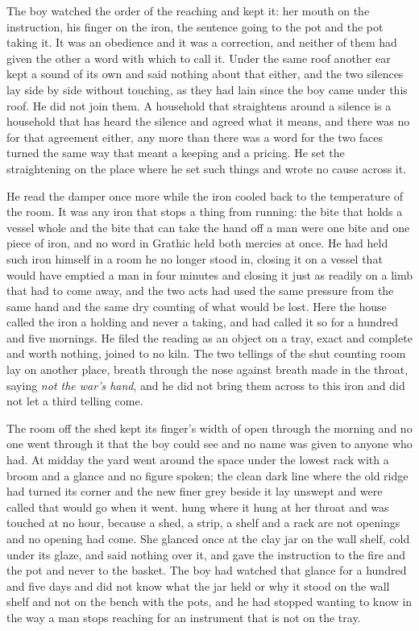 The boy watched the order of the reaching and kept it: her mouth on the instruction, his finger on the iron, the sentence going to the pot and the pot taking it. It was an obedience and it was a correction, and neither of them had given the other a word with which to call it. Under the same roof another ear kept a sound of its own and said nothing about that either, and the two silences lay side by side without touching, as they had lain since the boy came under this roof. He did not join them. A household that straightens around a silence is a household that has heard the silence and agreed what it means, and there was no  for that agreement either, any more than there was a word for the two faces turned the same way that meant a keeping and a pricing. He set the straightening on the place where he set such things and wrote no cause across it.

He read the damper once more while the iron cooled back to the temperature of the room. It was any iron that stops a thing from running: the bite that holds a vessel whole and the bite that can take the hand off a man were one bite and one piece of iron, and no word in Grathic held both mercies at once. He had held such iron himself in a room he no longer stood in, closing it on a vessel that would have emptied a man in four minutes and closing it just as readily on a limb that had to come away, and the two acts had used the same pressure from the same hand and the same dry counting of what would be lost. Here the house called the iron a holding and never a taking, and had called it so for a hundred and five mornings. He filed the reading as an object on a tray, exact and complete and worth nothing, joined to no kiln. The two tellings of the shut counting room lay on another place, breath through the nose against breath made in the throat, saying \emph{not the war's hand}, and he did not bring them across to this iron and did not let a third telling come.

\scenebreak

The room off the shed kept its finger's width of open through the morning and no one went through it that the boy could see and no name was given to anyone who had. At midday the yard went around the space under the lowest rack with a broom and a glance and no figure spoken; the clean dark line where the old  ridge had turned its corner and the new finer grey beside it lay unswept and were called  that would go when it went.  hung where it hung at her throat and was touched at no hour, because a shed, a strip, a shelf and a rack are not openings and no opening had come. She glanced once at the clay jar on the wall shelf, cold under its glaze, and said nothing over it, and gave the instruction to the fire and the pot and never to the basket. The boy had watched that glance for a hundred and five days and did not know what the jar held or why it stood on the wall shelf and not on the bench with the pots, and he had stopped wanting to know in the way a man stops reaching for an instrument that is not on the tray.

